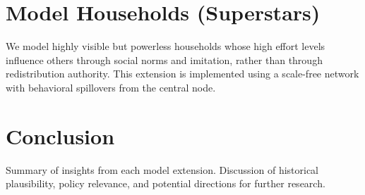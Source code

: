 \documentclass[12pt]{article}
\begin{document}
\section{Model Households (Superstars)}
We model highly visible but powerless households whose high effort levels influence others through social norms and imitation, rather than through redistribution authority. This extension is implemented using a scale-free network with behavioral spillovers from the central node.

\section{Conclusion}
Summary of insights from each model extension. Discussion of historical plausibility, policy relevance, and potential directions for further research.

  
\end{document}
